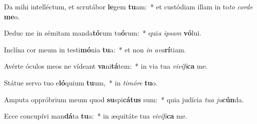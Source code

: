 \item Da mihi intelléctum, et scrutábor \textbf{le}gem \textbf{tu}am:~* et custódiam illam in to\textit{to} \textit{cor}\textit{de} \textbf{me}o.
\item Deduc me in sémitam manda\textbf{tó}rum tu\textbf{ó}rum:~* qui\textit{a} \textit{ip}\textit{sam} \textbf{vó}lui.
\item Inclína cor meum in testi\textbf{mó}nia \textbf{tu}a:~* et non \textit{in} \textit{a}\textit{va}\textbf{rí}tiam.
\item Avérte óculos meos ne vídeant \textbf{va}ni\textbf{tá}tem:~* in via tua \textit{vi}\textit{ví}\textit{fi}\textbf{ca} me.
\item Státue servo tuo e\textbf{ló}quium \textbf{tu}um,~* in \textit{ti}\textit{mó}\textit{re} \textbf{tu}o.
\item Amputa oppróbrium meum quod \textbf{su}spi\textbf{cá}\textbf{tus} sum:~* quia judícia \textit{tu}\textit{a} \textit{ju}\textbf{cún}da.
\item Ecce concupívi man\textbf{dá}ta \textbf{tu}a:~* in æquitáte tua \textit{vi}\textit{ví}\textit{fi}\textbf{ca} me.
